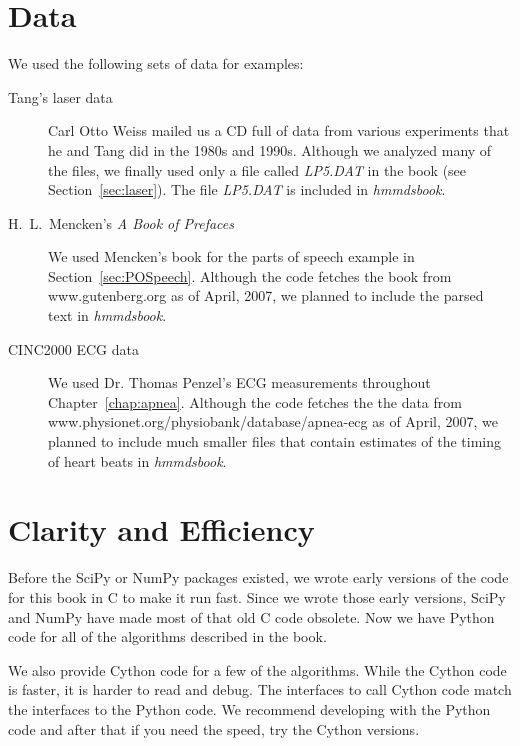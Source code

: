 \section*{Data}

We used the following sets of data for examples:
\begin{description}
\item[Tang's laser data] Carl Otto Weiss  mailed
  us a CD full of data from various experiments that he and Tang did
  in the 1980s and 1990s.  Although we analyzed many of the files, we
  finally used only a file called \emph{LP5.DAT} in the book (see
  Section~\ref{sec:laser}).  The file \emph{LP5.DAT} is included in
  \emph{hmmdsbook}.
\item[H.~L.~Mencken's \emph{A Book of Prefaces}] We used Mencken's
  book for the parts of speech example in Section~\ref{sec:POSpeech}.
  Although the code fetches the book from www.gutenberg.org as of
  April, 2007, we planned to include the parsed text in
  \emph{hmmdsbook}.
\item[CINC2000 ECG data] We used Dr. Thomas Penzel's ECG measurements
  throughout Chapter~\ref{chap:apnea}.  Although the code fetches the
  the data from\\
  www.physionet.org/physiobank/database/apnea-ecg as of April, 2007,
  we planned to include much smaller files that contain estimates of
  the timing of heart beats in \emph{hmmdsbook}.
\end{description}

\section*{Clarity and Efficiency}

Before the SciPy or NumPy packages existed, we wrote early versions of
the code for this book in C to make it run fast.  Since we wrote those
early versions, SciPy and NumPy have made most of that old C code
obsolete.  Now we have Python code for all of the algorithms described
in the book.

We also provide Cython code for a few of the algorithms.  While the
Cython code is faster, it is harder to read and debug.  The interfaces
to call Cython code match the interfaces to the Python code.  We
recommend developing with the Python code and after that if you need
the speed, try the Cython versions.

